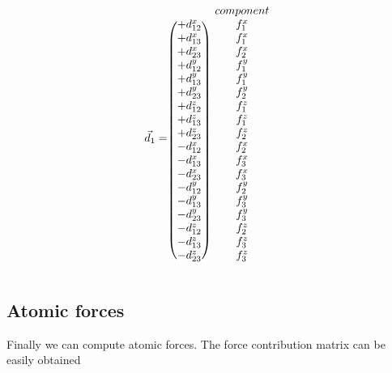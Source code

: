 \documentclass{article}
\begin{document}
\begin{equation}
\vec{d}_{1} = \begin{blockarray}{cc}
              & component \\
\begin{block}{(c)c}
	+d^x_{12} & f^x_1 \\
	+d^x_{13} & f^x_1 \\
	+d^x_{23} & f^x_2 \\
	+d^y_{12} & f^y_1 \\
	+d^y_{13} & f^y_1 \\
	+d^y_{23} & f^y_2 \\
	+d^z_{12} & f^z_1 \\
	+d^z_{13} & f^z_1 \\
	+d^z_{23} & f^z_2 \\
	-d^x_{12} & f^x_2 \\
	-d^x_{13} & f^x_3 \\
	-d^x_{23} & f^x_3 \\
	-d^y_{12} & f^y_2 \\
	-d^y_{13} & f^y_3 \\
	-d^y_{23} & f^y_3 \\
	-d^z_{12} & f^z_2 \\
	-d^z_{13} & f^z_3 \\
	-d^z_{23} & f^z_3 \\
\end{block}
\end{blockarray}
\end{equation}

\subsection{Atomic forces}

Finally we can compute atomic forces. The force contribution matrix can be easily obtained
\end{document}
